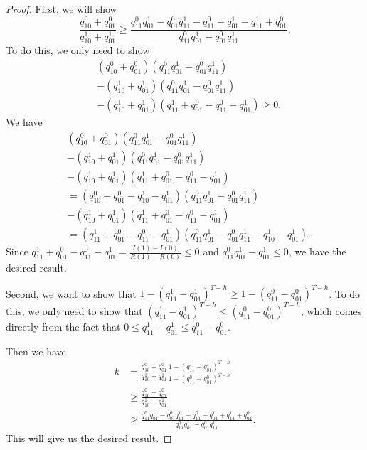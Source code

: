 \begin{proof}
First, we will show 
\begin{equation*}
    \frac{q^0_{10}+q^0_{01}}{q^1_{10}+q^1_{01}}\geq \frac{q^0_{11}q^1_{01}-q^0_{01}q^1_{11}-q^0_{11}-q^1_{01}+q^1_{11}+q^0_{01}}{q^0_{11}q^1_{01}-q^0_{01}q^1_{11}}.
\end{equation*}
To do this, we only need to show 
\begin{align*}
    &\left(q^0_{10}+q^0_{01}\right)\left(q^0_{11}q^1_{01}-q^0_{01}q^1_{11}\right)\\&-\left(q^1_{10}+q^1_{01}\right)\left(q^0_{11}q^1_{01}-q^0_{01}q^1_{11}\right)\\&-\left(q^1_{10}+q^1_{01}\right)\left(q^1_{11}+q^0_{01}-q^0_{11}-q^1_{01}\right)\geq 0.
\end{align*}
We have
\begin{align*}
    &\left(q^0_{10}+q^0_{01}\right)\left(q^0_{11}q^1_{01}-q^0_{01}q^1_{11}\right)\\&-\left(q^1_{10}+q^1_{01}\right)\left(q^0_{11}q^1_{01}-q^0_{01}q^1_{11}\right)\\&-\left(q^1_{10}+q^1_{01}\right)\left(q^1_{11}+q^0_{01}-q^0_{11}-q^1_{01}\right)\\
    &=\left(q^0_{10}+q^0_{01}-q^1_{10}-q^1_{01}\right)\left(q^0_{11}q^1_{01}-q^0_{01}q^1_{11}\right)\\
    &-\left(q^1_{10}+q^1_{01}\right)\left(q^1_{11}+q^0_{01}-q^0_{11}-q^1_{01}\right)\\
    &=\left(q^1_{11}+q^0_{01}-q^0_{11}-q^1_{01}\right)\left(q^0_{11}q^1_{01}-q^0_{01}q^1_{11}-q^1_{10}-q^1_{01}\right).
\end{align*}
Since $q^1_{11}+q^0_{01}-q^0_{11}-q^1_{01}=\frac{I(1)-I(0)}{R(1)-R(0)}\leq 0$ and $q^0_{11}q^1_{01}-q^1_{01}\leq 0$, we have the desired result.

Second, we want to show that $1-\left(q^1_{11}-q^1_{01}\right)^{T-h}\geq 1-\left(q^0_{11}-q^0_{01}\right)^{T-h}$. To do this, we only need to show that $\left(q^1_{11}-q^1_{01}\right)^{T-h}\leq \left(q^0_{11}-q^0_{01}\right)^{T-h}$, which comes directly from the fact that $0\leq q^1_{11}-q^1_{01}\leq q^0_{11}-q^0_{01}$.

Then we have
\begin{align*}
    k&=  \frac{q^0_{10}+q^0_{01}}{q^1_{10}+q^1_{01}}\frac{1-\left(q^1_{11}-q^1_{01}\right)^{T-h}}{1-\left(q^0_{11}-q^0_{01}\right)^{T-h}}\\&\geq \frac{q^0_{10}+q^0_{01}}{q^1_{10}+q^1_{01}}\\
    &\geq \frac{q^0_{11}q^1_{01}-q^0_{01}q^1_{11}-q^0_{11}-q^1_{01}+q^1_{11}+q^0_{01}}{q^0_{11}q^1_{01}-q^0_{01}q^1_{11}}.
\end{align*}
This will give us the desired result.


\end{proof}
